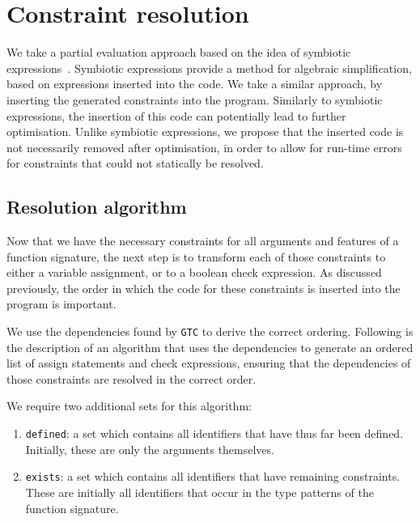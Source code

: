 
\newcommand{\defined}{\texttt{defined}}
\renewcommand{\exists}{\texttt{exists}}

\section{Constraint resolution}

We take a partial evaluation approach based on the idea of symbiotic expressions~\cite{sac-symbiotic}.
Symbiotic expressions provide a method for algebraic simplification, based on expressions inserted into the code.
We take a similar approach, by inserting the generated constraints into the program.
Similarly to symbiotic expressions, the insertion of this code can potentially lead to further optimisation.
Unlike symbiotic expressions, we propose that the inserted code is not necessarily removed after optimisation, in order to allow for run-time errors for constraints that could not statically be resolved.

\subsection{Resolution algorithm}\label{sec:resoltion}

Now that we have the necessary constraints for all arguments and features of a function signature, the next step is to transform each of those constraints to either a variable assignment, or to a boolean check expression.
As discussed previously, the order in which the code for these constraints is inserted into the program is important.

\noindent
We use the dependencies found by \texttt{GTC} to derive the correct ordering.
Following is the description of an algorithm that uses the dependencies to generate an ordered list of assign statements and check expressions, ensuring that the dependencies of those constraints are resolved in the correct order.

We require two additional sets for this algorithm:
\begin{enumerate}
    \item \defined{}: a set which contains all identifiers that have thus far been defined.
    Initially, these are only the arguments themselves.
    \item \exists{}: a set which contains all identifiers that have remaining constraints.
    These are initially all identifiers that occur in the type patterns of the function signature.
\end{enumerate}


